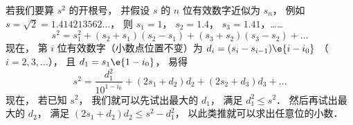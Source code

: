
若我们要算 $s^2$ 的开根号， 并假设 $s$ 的 $n$ 位有效数字近似为 $s_n$， 例如 $s = \sqrt{2} = 1.414213562\dots$， 则 $s_1 = 1$， $s_2=1.4$， $s_3=1.41$，……
\begin{equation}
s^2 = s_1^2 + (s_2+s_1)(s_2-s_1) + (s_3+s_2)(s_3-s_2) + \dots
\end{equation}
现在， 第 $i$ 位有效数字（小数点位置不变）为 $d_i = (s_i-s_{i-1})\e{i-i_0}$ （$i=2,3,\dots$）， 且 $d_1 = s_1\e{1-i_0}$， 易得
\begin{equation}
s^2 = \frac{d_1^2}{10^{1-i_0}} + (2s_1 + d_2)d_2 + (2s_2 + d_3)d_3 + \dots
\end{equation}
现在， 若已知 $s^2$， 我们就可以先试出最大的 $d_1$， 满足 $d_1^2\leqslant s^2$． 然后再试出最大的 $d_2$， 满足 $(2s_1 + d_2)d_2 \leqslant s^2 - d_1^2$， 以此类推就可以求出任意位的小数．
